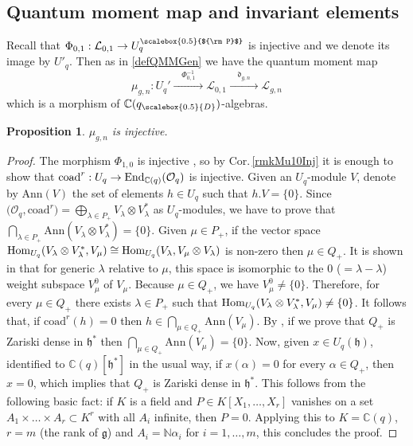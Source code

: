 \documentclass[11pt]{amsart}
\newtheorem{prop}[teo]{Proposition}
\newcommand{\mc}{\mathbb{C}}
\newcommand{\mn}{\mathbb{N}}
\newcommand{\Oo}{\mathcal{O}}
\newcommand{\qD}{q_{\scalebox{0.5}{D}}}
\newcommand{\Pup}{{\scalebox{0.5}{${\rm P}$}}}
\begin{document}
\subsection{Quantum moment map and invariant elements}\label{secQMMandInv}
Recall that $\Phi_{0,1} : \mathcal{L}_{0,1} \to U_q^\Pup$ is injective and we denote its image by $U'_q$. Then as in \eqref{defQMMGen} we have the quantum moment map
\[ \mu_{g,n} : U_q' \xrightarrow{\quad \Phi_{0,1}^{-1} \quad} \mathcal{L}_{0,1} \xrightarrow{\quad \mathfrak{d}_{g,n} \quad} \mathcal{L}_{g,n} \]
which is a morphism of $\mathbb{C}(\qD)$-algebras.
\begin{prop}\label{muinjq} $\mu_{g,n}$ is injective.
\end{prop}
\begin{proof} The morphism $\Phi_{1,0}$ is injective \cite[Th.\,3.13]{BFR}, so by Cor.\,\ref{rmkMu10Inj} it is enough to show that $\mathrm{coad}^r:U_q \to {\rm End}_{\mc(q)}(\Oo_q)$ is injective. Given an $U_q$-module $V$, denote by $\mathrm{Ann}(V)$ the set of elements $h\in U_q$ such that $h.V=\{0\}$. Since $\bigl( \mathcal{O}_q,\mathrm{coad}^r \bigr) = \textstyle\bigoplus_{\lambda \in P_+} V_\lambda \otimes V_\lambda^*$ as $U_q$-modules, we have to prove that $\textstyle \bigcap_{\lambda\in P_+} \mathrm{Ann}(V_\lambda \otimes V_\lambda^*)=\{0\}$. Given $\mu\in P_+$, if the vector space ${\rm Hom}_{U_q}(V_\lambda \otimes V_\lambda^*, V_\mu)\cong {\rm Hom}_{U_q}(V_\lambda , V_\mu\otimes V_\lambda)$ is non-zero then $\mu\in Q_+$. It is shown in \cite[Prop.\,17 and Def.\,5]{RS} that for generic $\lambda$ relative to $\mu$, this space is isomorphic to the $0$ ($=\lambda-\lambda$) weight subspace $V_\mu^0$ of $V_\mu$. Because $\mu \in Q_+$, we have $V_\mu^0\neq \{0\}$. Therefore, for every $\mu \in Q_+$ there exists $\lambda\in P_+$ such that ${\rm Hom}_{U_q}(V_\lambda \otimes V_\lambda^*, V_\mu)\ne \{0\}$. It follows that, if $\mathrm{coad}^r(h)=0$ then $h\in \textstyle \bigcap_{\mu\in Q_+} \mathrm{Ann}(V_\mu)$. By \cite[Lem.\,7.1.9]{Jos}, if we prove that $Q_+$ is Zariski dense in $\mathfrak{h}^*$ then $\textstyle \bigcap_{\mu\in Q_+} \mathrm{Ann}(V_\mu)=\{0\}$. Now, given $x\in U_q(\mathfrak{h})$, identified to $\mc(q)[\mathfrak{h}^*]$ in the usual way, if $x(\alpha)=0$ for every $\alpha\in Q_+$, then $x=0$, which implies that $Q_+$ is Zariski dense in $\mathfrak{h}^*$. This follows from the following basic fact: if $K$ is a field and $P\in K[X_1,\ldots,X_r]$ vanishes on a set $A_1\times \ldots \times A_r\subset K^r$ with all $A_i$ infinite, then $P=0$. Applying this to $K=\mc(q)$, $r=m$ (the rank of $\mathfrak{g}$) and $A_i = \mn \alpha_i$ for $i=1,\dots,m$, this concludes the proof.   
\end{proof}
\end{document}

